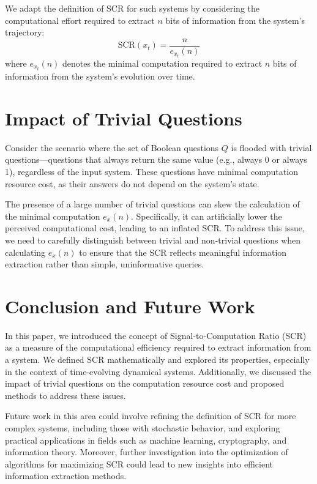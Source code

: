 \documentclass[11pt,a4paper]{article}
\theoremstyle{definition}
\theoremstyle{remark}
\numberwithin{equation}{section}
\begin{document}
We adapt the definition of SCR for such systems by considering the computational effort required to extract \(n\) bits of information from the system's trajectory:
\[
\text{SCR}(x_t) = \frac{n}{e_{x_t}(n)}
\]
where \(e_{x_t}(n)\) denotes the minimal computation required to extract \(n\) bits of information from the system's evolution over time.

\section{Impact of Trivial Questions}
Consider the scenario where the set of Boolean questions \(Q\) is flooded with trivial questions—questions that always return the same value (e.g., always 0 or always 1), regardless of the input system. These questions have minimal computation resource cost, as their answers do not depend on the system's state.

The presence of a large number of trivial questions can skew the calculation of the minimal computation \(e_x(n)\). Specifically, it can artificially lower the perceived computational cost, leading to an inflated SCR. To address this issue, we need to carefully distinguish between trivial and non-trivial questions when calculating \(e_x(n)\) to ensure that the SCR reflects meaningful information extraction rather than simple, uninformative queries.

\section{Conclusion and Future Work}
In this paper, we introduced the concept of Signal-to-Computation Ratio (SCR) as a measure of the computational efficiency required to extract information from a system. We defined SCR mathematically and explored its properties, especially in the context of time-evolving dynamical systems. Additionally, we discussed the impact of trivial questions on the computation resource cost and proposed methods to address these issues.

Future work in this area could involve refining the definition of SCR for more complex systems, including those with stochastic behavior, and exploring practical applications in fields such as machine learning, cryptography, and information theory. Moreover, further investigation into the optimization of algorithms for maximizing SCR could lead to new insights into efficient information extraction methods.
\end{document}

